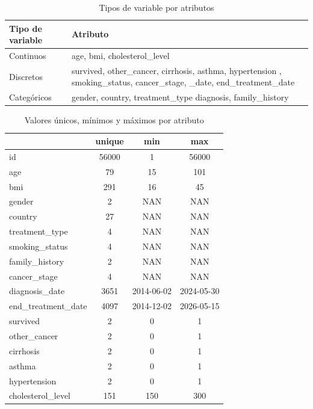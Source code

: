 \documentclass[10pt,journal,compsoc]{IEEEtran}
\begin{document}
\begin{table}[h!]
\centering
\begin{tabularx}{\columnwidth}{|l|X|}
\hline
\textbf{Tipo de variable}       & \textbf{Atributo}                 \\ \hline
Continuos                   & age, bmi, cholesterol\_level     \\ \hline
Discretos                   & survived, other\_cancer, cirrhosis, asthma, hypertension , smoking\_status, cancer\_stage, \_date, end\_treatment\_date \\ \hline
Categóricos                 & gender, country, treatment\_type diagnosis, family\_history  \\ \hline
\end{tabularx}
\caption{Tipos de variable por atributos}
\label{tab:tipoVariable}
\end{table}
\begin{table}[h!]
\centering
\begin{tabular}{|l|c|c|c|}
\hline
                        & \textbf{unique}   & \textbf{min}  & \textbf{max} \\ \hline
id                      &  56000        & 1             & 56000     \\ \hline
age                     &  79           & 15            & 101       \\ \hline
bmi                     &  291          & 16            & 45        \\ \hline
gender                  &  2            & NAN           & NAN       \\ \hline
country                 &  27           & NAN           & NAN       \\ \hline
treatment\_type         &  4            & NAN           & NAN \\ \hline
smoking\_status         &  4            & NAN           & NAN \\ \hline
family\_history         &  2            & NAN           & NAN \\ \hline
cancer\_stage           &  4            & NAN           &  NAN\\ \hline
diagnosis\_date         & 3651          & 2014-06-02    & 2024-05-30\\ \hline
end\_treatment\_date    &  4097         & 2014-12-02    & 2026-05-15 \\ \hline
survived                &  2            &  0            & 1\\ \hline
other\_cancer           &  2            & 0             & 1 \\ \hline
cirrhosis               &  2            & 0             & 1 \\ \hline
asthma                  &  2            & 0             & 1 \\ \hline
hypertension            &  2            & 0             & 1 \\ \hline
cholesterol\_level      &  151          & 150           & 300 \\ \hline
\end{tabular}
\caption{Valores únicos, mínimos y máximos por atributo}
\label{tab:valoresUnicos}
\end{table}
\end{document}
